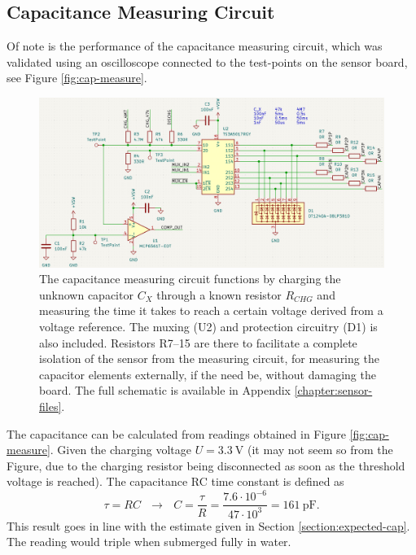 \subsection{\label{section:sensor-circuit}Capacitance Measuring Circuit}
Of note is the performance of the capacitance measuring circuit, which was validated using an oscilloscope connected to the test-points on the sensor board, see Figure \ref{fig:cap-measure}.
\begin{figure}[H]
    \includegraphics[width=.9\textwidth]{fig/sensor-measure-circuit.png}
    \caption{\label{fig:sensor-measure-circuit}The capacitance measuring circuit functions by charging the unknown capacitor $C_X$ through a known resistor $R_{CHG}$ and measuring the time it takes to reach a certain voltage derived from a voltage reference. The muxing (U2) and protection circuitry (D1) is also included. Resistors R7--15 are there to facilitate a complete isolation of the sensor from the measuring circuit, for measuring the capacitor elements externally, if the need be, without damaging the board. The full schematic is available in Appendix \ref{chapter:sensor-files}.}
\end{figure}

The capacitance can be calculated from readings obtained in Figure \ref{fig:cap-measure}. Given the charging voltage $U = 3.3~\mathrm{V}$ (it may not seem so from the Figure, due to the charging resistor being disconnected as soon as the threshold voltage is reached). The capacitance RC time constant is defined as
\begin{equation} %
    \tau = RC ~~~\rightarrow~~~ C = \dfrac{\tau}{R} = \dfrac{7.6 \cdot 10^{-6}}{47 \cdot 10^3} = 161~\mathrm{pF}.
\end{equation}
This result goes in line with the estimate given in Section \ref{section:expected-cap}. The reading would triple when submerged fully in water.


